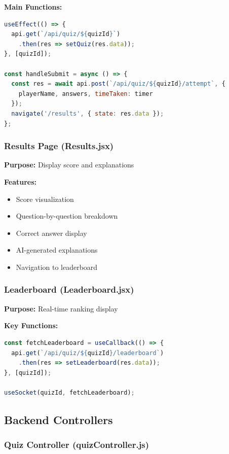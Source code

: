 \documentclass[12pt,a4paper]{article}
\begin{document}
\textbf{Main Functions:}
\begin{lstlisting}[language=JavaScript]
useEffect(() => {
  api.get(`/api/quiz/${quizId}`)
    .then(res => setQuiz(res.data));
}, [quizId]);

const handleSubmit = async () => {
  const res = await api.post(`/api/quiz/${quizId}/attempt`, {
    playerName, answers, timeTaken: timer
  });
  navigate('/results', { state: res.data });
};
\end{lstlisting}

\newpage

\subsubsection{Results Page (Results.jsx)}
\textbf{Purpose:} Display score and explanations

\textbf{Features:}
\begin{itemize}
    \item Score visualization
    \item Question-by-question breakdown
    \item Correct answer display
    \item AI-generated explanations
    \item Navigation to leaderboard
\end{itemize}

\subsubsection{Leaderboard (Leaderboard.jsx)}
\textbf{Purpose:} Real-time ranking display

\textbf{Key Functions:}
\begin{lstlisting}[language=JavaScript]
const fetchLeaderboard = useCallback(() => {
  api.get(`/api/quiz/${quizId}/leaderboard`)
    .then(res => setLeaderboard(res.data));
}, [quizId]);

useSocket(quizId, fetchLeaderboard);
\end{lstlisting}

\subsection{Backend Controllers}

\subsubsection{Quiz Controller (quizController.js)}
\end{document}
